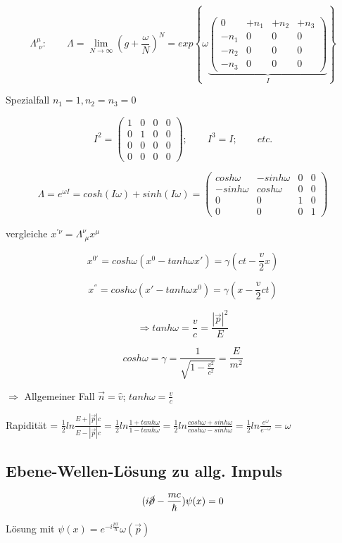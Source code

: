 \[\Lambda^\mu_{\,\,\nu}: \qquad \Lambda = \lim_{N \to \infty} (g+\frac{\omega}{N})^N = exp\left\{\omega\underbrace{ \begin{pmatrix} 0&+n_1&+n_2&+n_3\\  -n_1&0&0&0\\   -n_2&0&0&0\\  -n_3&0&0&0 \end{pmatrix}}_{I}  \right\}\]

Spezialfall \(n_1 = 1, n_2=n_3 = 0\)

\[I^2 = \begin{pmatrix} 1&0&0&0\\ 0&1&0&0 \\ 0&0&0&0\\ 0&0&0&0 \end{pmatrix};\qquad I^3=I;\qquad etc. \]

\[\Lambda = e^{\omega I} = cosh(I\omega) + sinh(I\omega) =  \begin{pmatrix} cosh\omega&-sinh\omega&0&0\\ -sinh\omega&cosh\omega&0&0 \\ 0&0&1&0\\ 0&0&0&1 \end{pmatrix} \]

vergleiche \(x^{'\nu} = \Lambda^\nu_{\,\,\mu}x^\mu\)


\[x^{0'} = cosh\omega(x^0-tanh\omega x') = \gamma(ct-\frac{v}{2}x)\]

\[x^{''} = cosh\omega(x'-tanh\omega x^0) = \gamma(x-\frac{v}{2}ct)\]

\[\Rightarrow tanh \omega = \frac{v}{c} = \frac{|\vec p|^2}{E}\]

\[cosh\omega =\gamma = \frac{1}{\sqrt{1-\frac{v^2}{c^2}}} = \frac{E}{m^2} \]


\(\Rightarrow \) Allgemeiner Fall \(\vec n = \hat v\); \(tanh\omega = \frac{v}{c}\)


Rapidität = \(\frac{1}{2} ln\frac{E+|\vec p|c}{E-|\vec p|c} =\frac{1}{2} ln\frac{1+tanh\omega}{1-tanh\omega} = \frac{1}{2} ln\frac{cosh\omega+sinh\omega}{cosh\omega-sinh\omega}  = \frac{1}{2}ln\frac{e^\omega}{e^{-\omega}} =\omega \)


\subsection{Ebene-Wellen-Lösung zu allg. Impuls}

\[(i\cancel \partial - \frac{mc}{\hbar})\psi(x) = 0\]

Lösung mit \(\psi(x) = e^{-i\frac{px}{\hbar}}\omega(\vec p)\)

